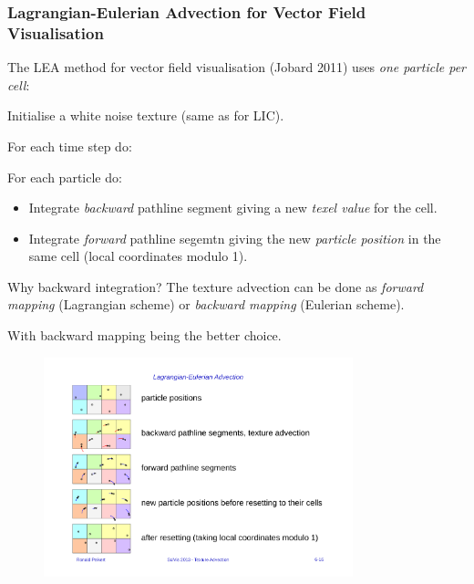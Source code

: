\subsubsection{Lagrangian-Eulerian Advection for Vector Field Visualisation}
The LEA method for vector field visualisation (Jobard 2011) uses \emph{one particle per cell}:

Initialise a white noise texture (same as for LIC).
\begin{description}
\item For each time step do:
    \begin{description}
        \item For each particle do:
            \begin{itemize}
                \item Integrate \emph{backward} pathline segment giving a new \emph{texel value} for the cell.
                \item Integrate \emph{forward} pathline segemtn giving the new \emph{particle position} in the same cell (local coordinates modulo 1).
            \end{itemize}

    \end{description}
\end{description}
Why backward integration? The texture advection can be done as \emph{forward mapping} (Lagrangian scheme) or \emph{backward mapping} (Eulerian scheme).

With backward mapping being the better choice.

\begin{figure}[H]
    \centering
    \includegraphics[width=0.8\textwidth]{img/06_eulerian_advection}
\end{figure}

